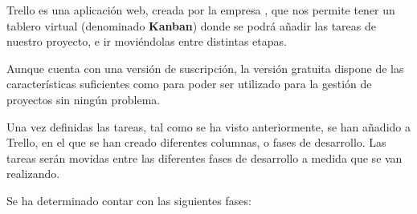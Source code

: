 \documentclass{\ClassPath/viu-tfm-template}
\begin{document}
Trello es una aplicación web, creada por la empresa \textcite{atlassian}, que nos permite tener un tablero virtual (denominado \textbf{Kanban}) donde se podrá añadir las tareas de nuestro proyecto, e ir moviéndolas entre distintas etapas.

Aunque cuenta con una versión de suscripción, la versión gratuita dispone de las características suficientes como para poder ser utilizado para la gestión de proyectos sin ningún problema.

Una vez definidas las tareas, tal como se ha visto anteriormente, se han añadido a Trello, en el que se han creado diferentes columnas, o fases de desarrollo. Las tareas serán movidas entre las diferentes fases de desarrollo a medida que se van realizando.

 Se ha determinado contar con las siguientes fases:
\end{document}

